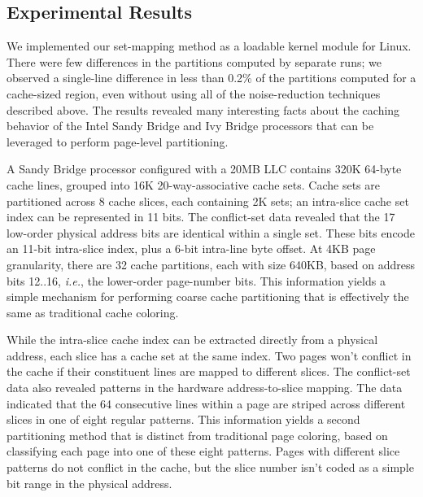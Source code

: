 \subsection{Experimental Results}

We implemented our set-mapping method as a loadable kernel module for
Linux.  There were few differences in the partitions computed by
separate runs; we observed a single-line difference in less than 0.2\%
of the partitions computed for a cache-sized region, even without
using all of the noise-reduction techniques described above.  The
results revealed many interesting facts about the caching behavior of
the Intel Sandy Bridge and Ivy Bridge processors that can be leveraged
to perform page-level partitioning.


A Sandy Bridge processor configured with a 20MB LLC contains 320K
64-byte cache lines, grouped into 16K 20-way-associative cache sets.
Cache sets are partitioned across 8 cache slices, each containing 2K
sets; an intra-slice cache set index can be represented in 11 bits.
The conflict-set data revealed that the 17 low-order physical address
bits are identical within a single set.  These bits encode an 11-bit
intra-slice index, plus a 6-bit intra-line byte offset.  At 4KB page
granularity, there are 32 cache partitions, each with size 640KB,
based on address bits 12..16, {\em i.e.}, the lower-order page-number
bits.  This information yields a simple mechanism for performing
coarse cache partitioning that is effectively the same as traditional
cache coloring.

While the intra-slice cache index can be extracted directly from a
physical address, each slice has a cache set at the same index.  Two
pages won't conflict in the cache if their constituent lines are
mapped to different slices.  The conflict-set data also revealed
patterns in the hardware address-to-slice mapping.  The data indicated
that the 64 consecutive lines within a page are striped across
different slices in one of eight regular patterns.  This information
yields a second partitioning method that is distinct from traditional
page coloring, based on classifying each page into one of these eight
patterns.  Pages with different slice patterns do not conflict in the
cache, but the slice number isn't coded as a simple bit range in the
physical address.

